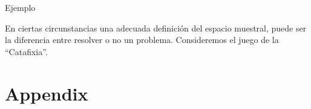 \documentclass[a4paper,12pt,twoside]{libro}
\theoremstyle{definition}
\begin{document}
Ejemplo

En ciertas circunstancias una adecuada definición del espacio muestral, puede ser la diferencia entre resolver o no un problema. Consideremos el juego de la “Catafixia”.

\appendix
\chapter{Appendix}

%
%
\end{document}
